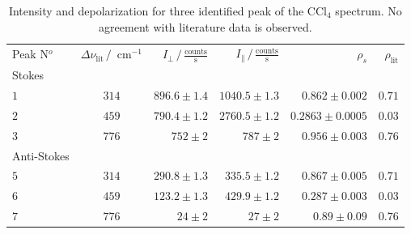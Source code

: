 \begin{table}[htpb]
    \centering
    \caption{
        Intensity and depolarization for three identified peak of the CCl$_4$ spectrum. No agreement with 
        literature data is observed.
        }
    \label{tab:ccl4_depol}
    \begin{tabular}{l c r r r r }
        \rowcolor{LightCyan} Peak N$^o$ & 
        $\Delta \nu_\text{lit} \, / \, \text{ cm}^{-1}$ & 
        $I_\perp \, / \, \frac{\text{counts}}{\text{s}}$ &
        $I_\parallel \, / \, \frac{\text{counts}}{\text{s}}$ &
        $\rho_s$  &
        $\rho_\text{lit}$\\
        \cellcolor{LightCyan}Stokes& &&&& \\
        \cellcolor{LightCyan}$1$ & $314$ & $896.6 \pm 1.4$ & $1040.5 \pm 1.3$ & $0.862 \pm 0.002$ & $0.71$ \\
        \cellcolor{LightCyan}$2$ & $459$ & $790.4 \pm 1.2$ & $2760.5 \pm 1.2$ & $0.2863 \pm 0.0005$ & $0.03$ \\
        \cellcolor{LightCyan}$3$ & $776$ & $752 \pm 2$ & $787 \pm 2$ & $0.956 \pm 0.003$ & $0.76$ \\
        \cellcolor{LightCyan}Anti-Stokes& &&&& \\
        \cellcolor{LightCyan}$5$ & $314$ & $290.8 \pm 1.3$ & $335.5 \pm 1.2$ & $0.867 \pm 0.005$ & $0.71$ \\
        \cellcolor{LightCyan}$6$ & $459$ & $123.2 \pm 1.3$ & $429.9 \pm 1.2$ & $0.287 \pm 0.003$ & $0.03$ \\
        \cellcolor{LightCyan}$7$ & $776$ & $24 \pm 2$ & $27 \pm 2$ & $0.89 \pm 0.09$ & $0.76$  
    \end{tabular}
\end{table}


